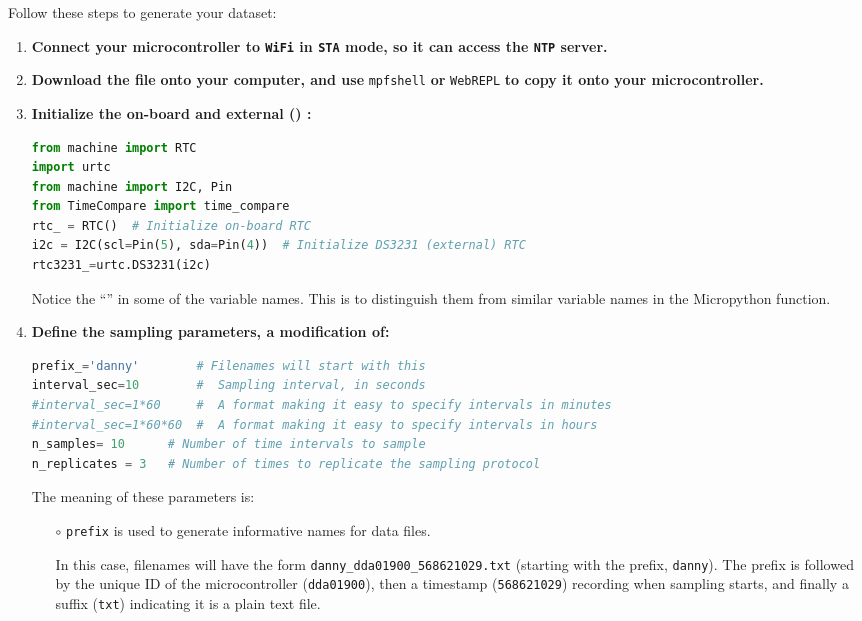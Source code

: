 Follow these steps to generate your dataset:
\begin{enumerate}
	\item \textbf{Connect your microcontroller to \texttt{WiFi} in \texttt{STA} mode, so it can access the \texttt{NTP} server.}
	\item \textbf{Download the file}  \textbf{ onto your computer, and use }\lstinline{mpfshell} \textbf{or} \lstinline{WebREPL} \textbf{to copy it onto your microcontroller.}
	\item \textbf{Initialize the on-board and external () \rtcs:}
\begin{lstlisting}[language=Python]
from machine import RTC
import urtc
from machine import I2C, Pin
from TimeCompare import time_compare
rtc_ = RTC()  # Initialize on-board RTC
i2c = I2C(scl=Pin(5), sda=Pin(4))  # Initialize DS3231 (external) RTC
rtc3231_=urtc.DS3231(i2c)
\end{lstlisting}
	Notice the ``\textunderscore'' in some of the variable names. 
	This is to distinguish them from similar variable names in the Micropython function.
	\item \textbf{Define the sampling parameters, a modification of:}
\begin{lstlisting}[language=Python]
prefix_='danny'        # Filenames will start with this
interval_sec=10        #  Sampling interval, in seconds
#interval_sec=1*60     #  A format making it easy to specify intervals in minutes
#interval_sec=1*60*60  #  A format making it easy to specify intervals in hours
n_samples= 10      # Number of time intervals to sample
n_replicates = 3   # Number of times to replicate the sampling protocol
\end{lstlisting}
	The meaning of these parameters is:
	\begin{itemize}
		\item[$\circ$] \lstinline{prefix} is used to generate informative names for data files.
		
		\smallskip
		In this case, filenames will have the form \lstinline{danny_dda01900_568621029.txt} (starting with the prefix, \lstinline{danny}). 
		The prefix is followed by the unique ID of the microcontroller (\lstinline{dda01900}), then a timestamp (\lstinline{568621029}) recording when sampling starts, and finally a suffix (\lstinline{txt}) indicating it is a plain text file.
		

\end{itemize}
\end{enumerate}
